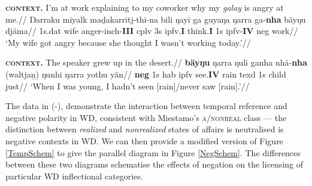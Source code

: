 \a\begingl\glpreamble\textbf{\textsc{context.}} I'm at work explaining to my coworker why my \textit{galay} is angry at me.//
\gla Ŋarraku miyalk maḏakarritj-thi-na bili ŋayi ga guyaŋa ŋarra ga-\textbf{nha} bäyŋu djäma//
\glb 1s.\gls{dat} wife anger-\gls{inch}-\textbf{III} \gls{cplv} 3s \gls{ipfv}.\textbf{I} think.\textbf{I}\footnotemark{} 1s \gls{ipfv}-\textbf{IV} \gls{neg} work//
\glft`My wife got angry because she thought I wasn't working today.'\trailingcitation{[DG~20190417]}//\endgl

\a\begingl\glpreamble \textbf{\textsc{context.}} The speaker grew up in the desert.//
\gla \textbf{bäyŋu} ŋarra ŋuli ganha nhä-\textbf{nha} (waltjaṉ) ŋunhi ŋarra yothu yän//
\glb \textbf{\gls{neg}} 1s 	\gls{hab} \gls{ipfv} see.\textbf{IV} rain \gls{texd} 1s child just//
\glft`When I was young, I hadn't seen [rain]/never saw [rain].'\trailingcitation{[AW~20190501]}//\endgl

\xe

The data in (-), demonstrate the interaction between temporal reference and negative polarity in WD, consistent with Miestamo's \textsc{a/nonreal} class --- the distinction between \textit{realized} and \textit{nonrealized} states of affairs is neutralised is negative contexts in WD. We can then provide a modified version of Figure \ref{TempSchem} to give the parallel diagram in Figure \ref{NegSchem}. The differences between these two diagrams schematise the effects of negation on the licensing of particular WD inflectional categories.

